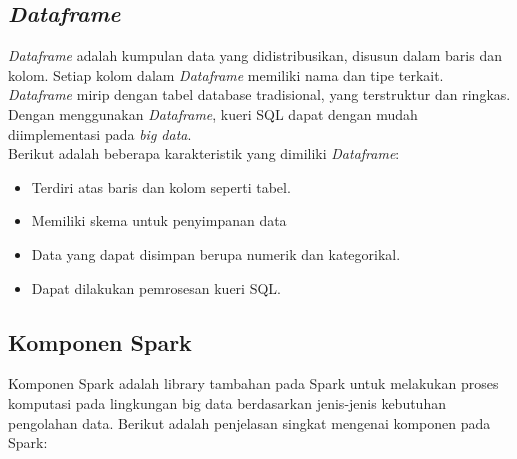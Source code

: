 \subsection{\textit{Dataframe}}
\label{sec:dataframe}
\textit{Dataframe} adalah kumpulan data yang didistribusikan, disusun dalam baris dan kolom. Setiap kolom dalam \textit{Dataframe} memiliki nama dan tipe terkait. \textit{Dataframe} mirip dengan tabel database tradisional, yang terstruktur dan ringkas. Dengan menggunakan \textit{Dataframe}, kueri SQL dapat dengan mudah diimplementasi pada \textit{big data}.\\

\noindent Berikut adalah beberapa karakteristik yang dimiliki \textit{Dataframe}:
\begin{itemize}
\item Terdiri atas baris dan kolom seperti tabel.
\item Memiliki skema untuk penyimpanan data
\item Data yang dapat disimpan berupa numerik dan kategorikal.
\item Dapat dilakukan pemrosesan kueri SQL.
\end{itemize}

\newpage
\subsection{Komponen Spark}
\label{sec:komponen_spark}
Komponen Spark adalah library tambahan pada Spark untuk melakukan proses komputasi pada lingkungan big data berdasarkan jenis-jenis kebutuhan pengolahan data. Berikut adalah penjelasan singkat mengenai komponen pada Spark:

